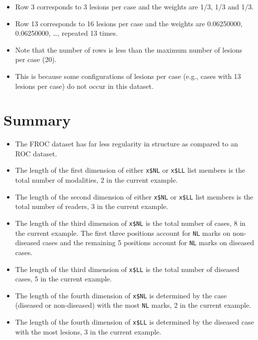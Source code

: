 \documentclass[
]{book}
\providecommand{\tightlist}{%
  \setlength{\itemsep}{0pt}\setlength{\parskip}{0pt}}
\begin{document}
\begin{itemize}
\tightlist
\item
  Row 3 corresponds to 3 lesions per case and the weights are 1/3, 1/3 and 1/3.
\item
  Row 13 corresponds to 16 lesions per case and the weights are 0.06250000, 0.06250000, \ldots, repeated 13 times.
\item
  Note that the number of rows is less than the maximum number of lesions per case (20).
\item
  This is because some configurations of lesions per case (e.g., cases with 13 lesions per case) do not occur in this dataset.
\end{itemize}

\hypertarget{frocdataformat-Summary}{%
\section{Summary}\label{frocdataformat-Summary}}

\begin{itemize}
\tightlist
\item
  The FROC dataset has far less regularity in structure as compared to an ROC dataset.
\item
  The length of the first dimension of either \texttt{x\$NL} or \texttt{x\$LL} list members is the total number of modalities, 2 in the current example.
\item
  The length of the second dimension of either \texttt{x\$NL} or \texttt{x\$LL} list members is the total number of readers, 3 in the current example.
\item
  The length of the third dimension of \texttt{x\$NL} is the total number of cases, 8 in the current example. The first three positions account for \texttt{NL} marks on non-diseased cases and the remaining 5 positions account for \texttt{NL} marks on diseased cases.
\item
  The length of the third dimension of \texttt{x\$LL} is the total number of diseased cases, 5 in the current example.
\item
  The length of the fourth dimension of \texttt{x\$NL} is determined by the case (diseased or non-diseased) with the most \texttt{NL} marks, 2 in the current example.
\item
  The length of the fourth dimension of \texttt{x\$LL} is determined by the diseased case with the most lesions, 3 in the current example.
\end{itemize}
\end{document}
